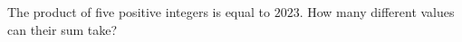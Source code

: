 The product of five positive integers is equal to $2023$. How many different values can their sum take?

